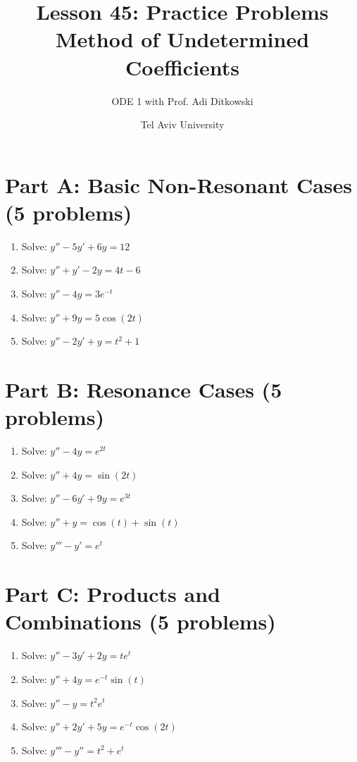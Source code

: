\documentclass[12pt]{article}
\title{Lesson 45: Practice Problems\\Method of Undetermined Coefficients}
\author{ODE 1 with Prof. Adi Ditkowski}
\date{Tel Aviv University}
\begin{document}
\maketitle

\section*{Part A: Basic Non-Resonant Cases (5 problems)}

\begin{enumerate}
\item Solve: $y'' - 5y' + 6y = 12$

\item Solve: $y'' + y' - 2y = 4t - 6$

\item Solve: $y'' - 4y = 3e^{-t}$

\item Solve: $y'' + 9y = 5\cos(2t)$

\item Solve: $y'' - 2y' + y = t^2 + 1$
\end{enumerate}

\section*{Part B: Resonance Cases (5 problems)}

\begin{enumerate}[resume]
\item Solve: $y'' - 4y = e^{2t}$

\item Solve: $y'' + 4y = \sin(2t)$

\item Solve: $y'' - 6y' + 9y = e^{3t}$

\item Solve: $y'' + y = \cos(t) + \sin(t)$

\item Solve: $y''' - y' = e^t$
\end{enumerate}

\section*{Part C: Products and Combinations (5 problems)}

\begin{enumerate}[resume]
\item Solve: $y'' - 3y' + 2y = te^t$

\item Solve: $y'' + 4y = e^{-t}\sin(t)$

\item Solve: $y'' - y = t^2e^t$

\item Solve: $y'' + 2y' + 5y = e^{-t}\cos(2t)$

\item Solve: $y''' - y'' = t^2 + e^t$
\end{enumerate}
\end{document}
